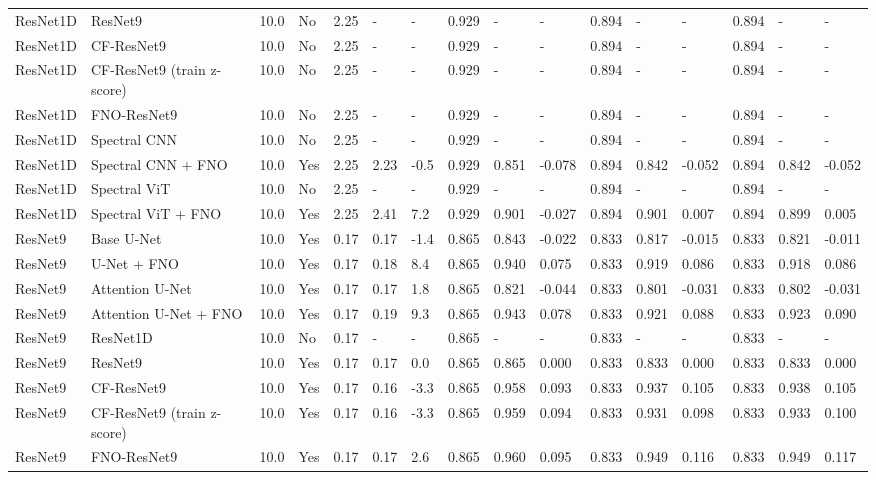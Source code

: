 \begin{longtable}{llllllllllllllll}
ResNet1D & ResNet9 & 10.0 & No & 2.25 & - & - & 0.929 & - & - & 0.894 & - & - & 0.894 & - & - \\
ResNet1D & CF-ResNet9 & 10.0 & No & 2.25 & - & - & 0.929 & - & - & 0.894 & - & - & 0.894 & - & - \\
ResNet1D & CF-ResNet9 (train z-score) & 10.0 & No & 2.25 & - & - & 0.929 & - & - & 0.894 & - & - & 0.894 & - & - \\
ResNet1D & FNO-ResNet9 & 10.0 & No & 2.25 & - & - & 0.929 & - & - & 0.894 & - & - & 0.894 & - & - \\
ResNet1D & Spectral CNN & 10.0 & No & 2.25 & - & - & 0.929 & - & - & 0.894 & - & - & 0.894 & - & - \\
ResNet1D & Spectral CNN + FNO & 10.0 & Yes & 2.25 & 2.23 & -0.5 & 0.929 & 0.851 & -0.078 & 0.894 & 0.842 & -0.052 & 0.894 & 0.842 & -0.052 \\
ResNet1D & Spectral ViT & 10.0 & No & 2.25 & - & - & 0.929 & - & - & 0.894 & - & - & 0.894 & - & - \\
ResNet1D & Spectral ViT + FNO & 10.0 & Yes & 2.25 & 2.41 & 7.2 & 0.929 & 0.901 & -0.027 & 0.894 & 0.901 & 0.007 & 0.894 & 0.899 & 0.005 \\
ResNet9 & Base U-Net & 10.0 & Yes & 0.17 & 0.17 & -1.4 & 0.865 & 0.843 & -0.022 & 0.833 & 0.817 & -0.015 & 0.833 & 0.821 & -0.011 \\
ResNet9 & U-Net + FNO & 10.0 & Yes & 0.17 & 0.18 & 8.4 & 0.865 & 0.940 & 0.075 & 0.833 & 0.919 & 0.086 & 0.833 & 0.918 & 0.086 \\
ResNet9 & Attention U-Net & 10.0 & Yes & 0.17 & 0.17 & 1.8 & 0.865 & 0.821 & -0.044 & 0.833 & 0.801 & -0.031 & 0.833 & 0.802 & -0.031 \\
ResNet9 & Attention U-Net + FNO & 10.0 & Yes & 0.17 & 0.19 & 9.3 & 0.865 & 0.943 & 0.078 & 0.833 & 0.921 & 0.088 & 0.833 & 0.923 & 0.090 \\
ResNet9 & ResNet1D & 10.0 & No & 0.17 & - & - & 0.865 & - & - & 0.833 & - & - & 0.833 & - & - \\
ResNet9 & ResNet9 & 10.0 & Yes & 0.17 & 0.17 & 0.0 & 0.865 & 0.865 & 0.000 & 0.833 & 0.833 & 0.000 & 0.833 & 0.833 & 0.000 \\
ResNet9 & CF-ResNet9 & 10.0 & Yes & 0.17 & 0.16 & -3.3 & 0.865 & 0.958 & 0.093 & 0.833 & 0.937 & 0.105 & 0.833 & 0.938 & 0.105 \\
ResNet9 & CF-ResNet9 (train z-score) & 10.0 & Yes & 0.17 & 0.16 & -3.3 & 0.865 & 0.959 & 0.094 & 0.833 & 0.931 & 0.098 & 0.833 & 0.933 & 0.100 \\
ResNet9 & FNO-ResNet9 & 10.0 & Yes & 0.17 & 0.17 & 2.6 & 0.865 & 0.960 & 0.095 & 0.833 & 0.949 & 0.116 & 0.833 & 0.949 & 0.117 \\

\end{longtable}
